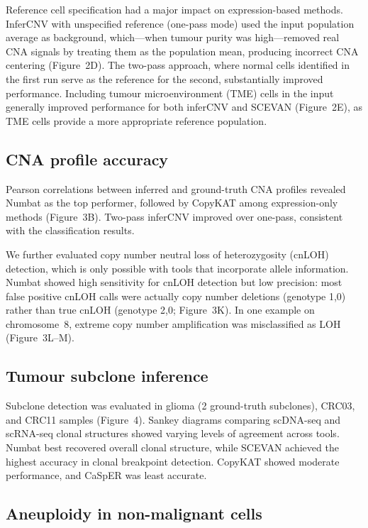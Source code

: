 \documentclass[11pt]{article}
\begin{document}
Reference cell specification had a major impact on expression-based methods. InferCNV with unspecified reference (one-pass mode) used the input population average as background, which---when tumour purity was high---removed real CNA signals by treating them as the population mean, producing incorrect CNA centering (Figure~2D). The two-pass approach, where normal cells identified in the first run serve as the reference for the second, substantially improved performance. Including tumour microenvironment (TME) cells in the input generally improved performance for both inferCNV and SCEVAN (Figure~2E), as TME cells provide a more appropriate reference population.

\subsection{CNA profile accuracy}

Pearson correlations between inferred and ground-truth CNA profiles revealed Numbat as the top performer, followed by CopyKAT among expression-only methods (Figure~3B). Two-pass inferCNV improved over one-pass, consistent with the classification results.

We further evaluated copy number neutral loss of heterozygosity (cnLOH) detection, which is only possible with tools that incorporate allele information. Numbat showed high sensitivity for cnLOH detection but low precision: most false positive cnLOH calls were actually copy number deletions (genotype 1,0) rather than true cnLOH (genotype 2,0; Figure~3K). In one example on chromosome~8, extreme copy number amplification was misclassified as LOH (Figure~3L--M).

\subsection{Tumour subclone inference}

Subclone detection was evaluated in glioma (2 ground-truth subclones), CRC03, and CRC11 samples (Figure~4). Sankey diagrams comparing scDNA-seq and scRNA-seq clonal structures showed varying levels of agreement across tools. Numbat best recovered overall clonal structure, while SCEVAN achieved the highest accuracy in clonal breakpoint detection. CopyKAT showed moderate performance, and CaSpER was least accurate.

\subsection{Aneuploidy in non-malignant cells}
\end{document}
